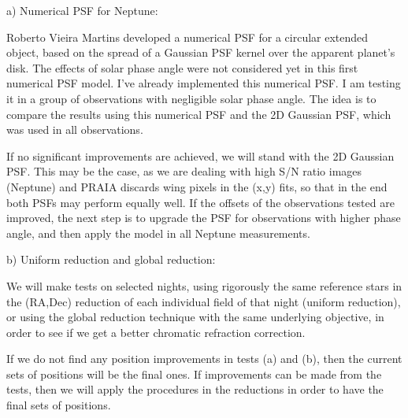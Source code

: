 \documentclass[12pt,a4paper]{report}
\begin{document}
a) Numerical PSF for Neptune:

Roberto Vieira Martins developed a numerical PSF for a circular extended object, based on the spread of a Gaussian PSF kernel over the apparent planet's disk. The effects of solar phase angle were not considered yet in this first numerical PSF model. I've already implemented this numerical PSF. I am testing it in a group of observations with negligible solar phase angle. The idea is to compare the results using this numerical PSF and the 2D Gaussian PSF, which was used in all observations.

If no significant improvements are achieved, we will stand with the 2D Gaussian PSF. This may be the case, as we are dealing with high S/N ratio images (Neptune) and PRAIA discards wing pixels in the (x,y) fits, so that in the end both PSFs may perform equally well. If the offsets of the observations tested are improved, the next step is to upgrade the PSF for observations with higher phase angle, and then apply the model in all Neptune measurements.


b) Uniform reduction and global reduction:

We will make tests on selected nights, using rigorously the same reference stars in the (RA,Dec) reduction of each individual field of that night (uniform reduction), or using the global reduction technique with the same underlying objective, in order to see if we get a better chromatic refraction correction.


If we do not find any position improvements in tests (a) and (b), then the current sets of positions will be the final ones. If improvements can be made from the tests, then we will apply the procedures in the reductions in order to have the final sets of positions. 




\end{document}
